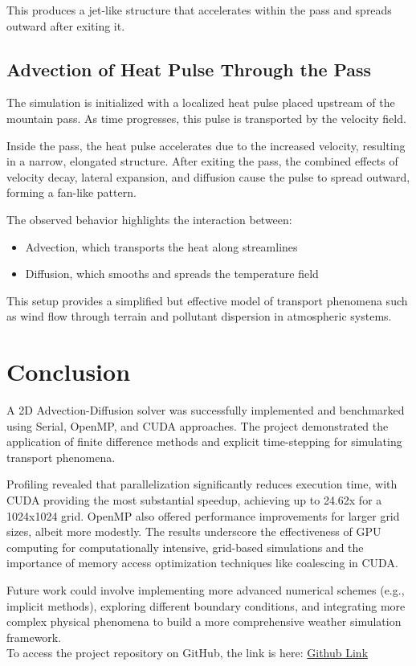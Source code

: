 \documentclass[conference]{IEEEtran}
\begin{document}
This produces a jet-like structure that accelerates within the pass and spreads outward after exiting it.

\subsection{Advection of Heat Pulse Through the Pass}

The simulation is initialized with a localized heat pulse placed upstream of the mountain pass. As time progresses, this pulse is transported by the velocity field.

Inside the pass, the heat pulse accelerates due to the increased velocity, resulting in a narrow, elongated structure. After exiting the pass, the combined effects of velocity decay, lateral expansion, and diffusion cause the pulse to spread outward, forming a fan-like pattern.

The observed behavior highlights the interaction between:
\begin{itemize}
    \item Advection, which transports the heat along streamlines
    \item Diffusion, which smooths and spreads the temperature field
\end{itemize}

This setup provides a simplified but effective model of transport phenomena such as wind flow through terrain and pollutant dispersion in atmospheric systems.

\section{Conclusion}

A 2D Advection-Diffusion solver was successfully implemented and benchmarked using Serial, OpenMP, and CUDA approaches. The project demonstrated the application of finite difference methods and explicit time-stepping for simulating transport phenomena.

Profiling revealed that parallelization significantly reduces execution time, with CUDA providing the most substantial speedup, achieving up to 24.62x for a 1024x1024 grid. OpenMP also offered performance improvements for larger grid sizes, albeit more modestly. The results underscore the effectiveness of GPU computing for computationally intensive, grid-based simulations and the importance of memory access optimization techniques like coalescing in CUDA.

Future work could involve implementing more advanced numerical schemes (e.g., implicit methods), exploring different boundary conditions, and integrating more complex physical phenomena to build a more comprehensive weather simulation framework. \\
To access the project repository on GitHub, the link is here: \href{https://github.com/AdithyaRajuNair/2D-Advection-Diffusion-Benchmark}{Github Link}
\balance
\end{document}
